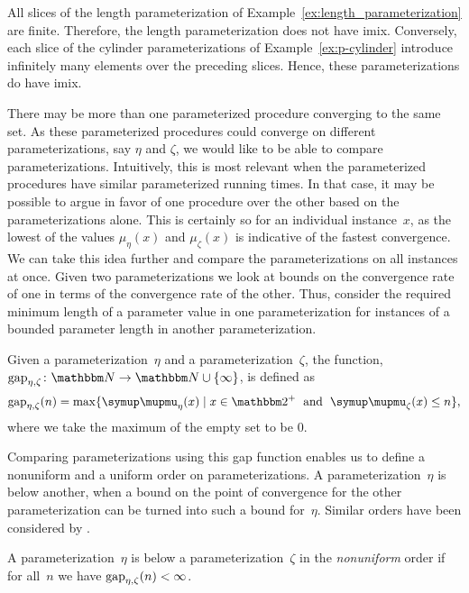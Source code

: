 \begin{example}
  All slices of the length parameterization of Example~\ref{ex:length_parameterization} are finite.
  Therefore, the length parameterization does not have imix.
  Conversely, each slice of the \pdash{}cylinder parameterizations of Example~\ref{ex:p-cylinder} introduce infinitely many elements over the preceding slices.
  Hence, these parameterizations do have imix.
\end{example}

There may be more than one parameterized procedure converging to the same set.
As these parameterized procedures could converge on different parameterizations, say $\eta$ and $\zeta$, we would like to be able to compare parameterizations.
Intuitively, this is most relevant when the parameterized procedures have similar parameterized running times.
In that case, it may be possible to argue in favor of one procedure over the other based on the parameterizations alone.
This is certainly so for an individual instance~$x$, as the lowest of the values $\mu_\eta(x)$ and $\mu_\zeta(x)$ is indicative of the fastest convergence.
We can take this idea further and compare the parameterizations on all instances at once.
Given two parameterizations we look at bounds on the convergence rate of one in terms of the convergence rate of the other.
Thus, consider the required minimum length of a parameter value in one parameterization for instances of a bounded parameter length in another parameterization.
\begin{definition}
  Given a parameterization~$\eta$ and a parameterization~$\zeta$, the  function, $\gap_{\eta, \zeta}\colon \bbN \to \bbN \cup \{\infty\}$, is defined as
  \begin{equation*}
    \gap_{\eta, \zeta}(n) \deq \max\{\mu_{\eta}(x) \st x \in \binary^+ \reland \mu_{\zeta}(x) \le n\},
  \end{equation*}
  where we take the maximum of the empty set to be $0$.
\end{definition}

Comparing parameterizations using this gap function enables us to define a nonuniform and a uniform order on parameterizations.
A parameterization~$\eta$ is below another, when a bound on the point of convergence for the other parameterization can be turned into such a bound for~$\eta$.
Similar orders have been considered by \textcite{komusiewicz2012new,fellows2013towards}.

\begin{definition}
  A parameterization~$\eta$ is below a parameterization~$\zeta$ in the \emph{nonuniform} order  if for all~$n$ we have $\operatorname{gap}_{\eta, \zeta}(n) < \infty$.
\end{definition}

